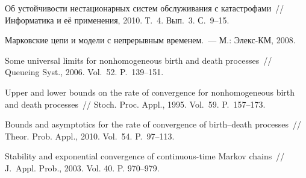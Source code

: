 \begin{multicols}{2}
{{\begin{thebibliography}{99}
Об устойчивости  нестационарных систем обслуживания с катастрофами~//  
Информатика и её применения, 2010. Т.~4. Вып.~3. С.~9--15.

Марковские цепи и модели с непрерывным временем.~--- М.: Элекс-КМ, 2008.

Some universal limits for nonhomogeneous birth and death
processes~// Queueing Syst., 2006. Vol.~52. P.~139--151.

   Upper and lower bounds on the rate of
convergence for nonhomogeneous birth and death processes~//  Stoch. Proc. Appl., 1995. 
Vol.~59. P.~157--173.

Bounds and asymptotics for the rate of convergence of birth--death processes~//  
Theor. Prob. Appl., 2010. Vol.~54. P.~97--113.

\label{end\stat}

 Stability and exponential 
convergence of continuous-time Markov chains~//  J.~Appl. Prob., 2003. Vol. 40.
P. 970--979.

 \end{thebibliography}
}
}


\end{multicols}       